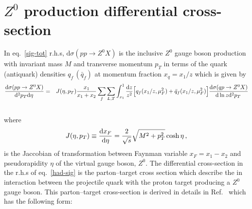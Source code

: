 \documentclass[aps,prd,preprint,superscriptaddress,nofootinbib]{revtex4-2}
\renewcommand{\dd}{\mathrm{d}}
\begin{document}
\section{$Z^0$ production differential cross-section}
In eq.~\eqref{sig-tot} r.h.s, $\dd \sigma(pp \rightarrow Z^0 X)$ is the inclusive $Z^0$ gauge boson production with invariant mass $M$ and transverse momentum $p_T$ in terms of the quark (antiquark) densities $q_f\, (\bar q_f)$ at momentum fraction $x_q = x_1/z$ which is given by
\begin{eqnarray}\label{had-sig}
	{ \dd \sigma(pp \rightarrow Z^0 X)
		\over 
		\dd^2 p_T \dd \eta \, 
	} &=& J(\eta,p_T) {x_1 \over x_1 + x_2} 
	\sum_f \sum_{L,T} \int^1_{x_1} {\dd z \over z^2} 
\Big[ 
	q_f(x_1/z,\mu^2_F) + \bar q_f(x_1/z,\mu^2_F)
\Big]
{ \dd \sigma(qp \rightarrow Z^0 X)
	\over 
	\dd \ln z \dd^2 p_T \, 
} \nonumber \\ &&
\end{eqnarray}
where 
\begin{eqnarray}
 	J(\eta, p_T) \equiv {\dd x_F \over \dd \eta } = { 2 \over \sqrt s}
 	\sqrt{M^2 + p_T^2} \cosh \eta \, ,
\end{eqnarray}
is the Jaccobian of transformation between Faynman variable $x_F =x_1 - x_2$ and pseudorapidity $\eta$ of the virtual gauge boson, $Z^0$. The differential cross-section in the r.h.s of eq.~\eqref{had-sig} is the parton--target cross section which describe the in interaction between the projectile quark with the proton target producing a $Z^0$ gauge boson. This parton--target cross-section is derived in details in Ref.~\cite{Bandeira:2024zjl} which has the following form:
\end{document}
